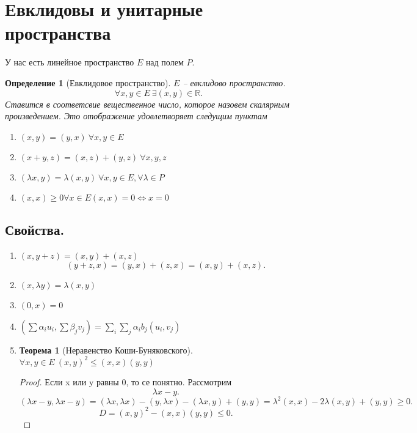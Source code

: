 \documentclass{scrartcl}
\newtheorem{theorem}{Теорема}
\newtheorem{definition}{Определение}
\begin{document}
\section{Евклидовы и унитарные пространства}
У нас есть линейное пространство $E$ над полем $P$. 
\begin{definition}[Евклидовое пространство]
    $E$ -- евклидово пространство.
     \[
    \forall  x,y \in E ~ \exists  (x,y) \in \mathbb{R}
    .\] 
    Ставится в соответсвие вещественное число, которое назовем скалярным произведением. Это отображение удовлетворяет следущим пунктам
    \begin{enumerate}
        \item $(x,y) = (y,x) ~ \forall  x, y \in E$
        \item $(x + y,z) = (x,z) + (y,z) ~\forall  x,y,z$
        \item $(\lambda x,y) = \lambda(x,y) ~ \forall  x,y \in E, \forall  \lambda \in P$
        \item $(x,x) \ge 0 \forall  x \in E (x,x) = 0 \iff x = 0$
    \end{enumerate}
\end{definition}
\subsection{Свойства.}
\begin{enumerate}
    \item $(x,y+z) = (x,y) + (x,z)$
        \[
            (y + z,x ) = (y,x) + (z,x) = (x,y) + (x,z)
        .\] 
    \item $(x,\lambda y) = \lambda (x,y)$
    \item $(0,x) = 0 $
    \item $( \sum \alpha_{i} u_{i},\sum \beta_{j} v_{j} ) = \sum_{i}\sum_{j}\alpha_{i}b_{j}(u_{i},v_{j})$ 
    \item 
        \begin{theorem}[Неравенство Коши-Буняковского]
            $\forall x,y \in E ~ (x,y)^{2} \le (x,x)(y,y)$
        \end{theorem}
        \begin{proof}
            Если x или y равны 0, то се понятно. Рассмотрим
            \[
            \lambda x - y
            .\] 
            \[
                (\lambda x - y,\lambda x - y) = (\lambda x,\lambda x) - (y,\lambda x)
                - (\lambda x, y) + (y,y) = 
                \lambda^2 (x,x) - 2\lambda (x,y) + (y,y) \ge  0
            .\] 
            \[
            D = (x,y)^2 - (x,x)(y,y) \le  0
            .\] 
        \end{proof}
\end{enumerate}
\end{document}
